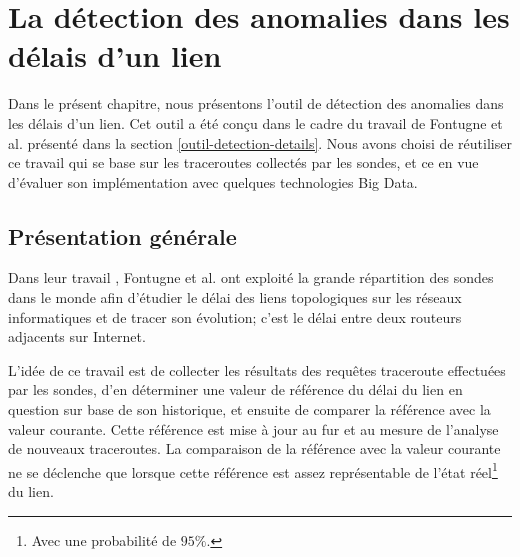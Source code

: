 \chapter{La détection des anomalies dans les délais d'un lien} \label{chap:algorith-detection}

Dans le présent chapitre, nous présentons l'outil de détection des anomalies dans les délais d'un lien. Cet outil a été  conçu dans le cadre du travail \cite{DBLP:journals/corr/FontugneAPB16}  de  Fontugne et al. présenté dans la section \ref{outil-detection-details}. Nous avons choisi de réutiliser ce travail qui se base sur les traceroutes collectés par les sondes, et ce en vue d'évaluer son implémentation avec quelques technologies  Big Data.   

\section{Présentation générale}

Dans leur travail \cite{DBLP:journals/corr/FontugneAPB16}, Fontugne et al. ont exploité la grande répartition  des sondes  dans le monde afin d'étudier le délai des liens topologiques sur les réseaux informatiques et de tracer son évolution; c'est le délai entre deux routeurs adjacents sur Internet.

L'idée de ce travail est de collecter les résultats des requêtes traceroute effectuées par les sondes, d'en déterminer une valeur de référence du délai du lien en question sur base de  son historique, et ensuite de comparer la référence avec la valeur courante.  Cette référence est mise à jour au fur et au mesure de l'analyse de nouveaux traceroutes. 
La comparaison de la référence avec la valeur courante ne se déclenche que lorsque cette  référence est assez représentable de l'état réel\footnote{Avec une probabilité de $95\%$.} du lien.


